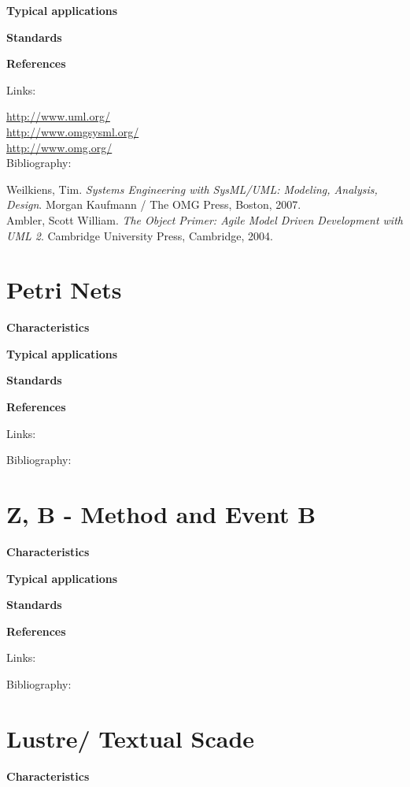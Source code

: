 \documentclass{./template/openetcs2}
\begin{document}
	\textbf{Typical applications}


	\textbf{Standards}


	\textbf{References}

Links:

\url{http://www.uml.org/} \\[4pt]
\url{http://www.omgsysml.org/}\\[4pt]
\url{http://www.omg.org/} \\[4pt]

Bibliography:

Weilkiens, Tim. \textit{Systems Engineering with SysML/UML: Modeling, Analysis, Design}. Morgan Kaufmann / The OMG Press, Boston,  2007.\\[4pt]
Ambler, Scott William. \textit{The Object Primer: Agile Model Driven Development with UML 2}. Cambridge University Press, Cambridge, 2004.\\[4pt]

\section{Petri Nets}


	\textbf{Characteristics}


	\textbf{Typical applications}


	\textbf{Standards}


	\textbf{References}

Links:



Bibliography:




\section{Z, B - Method and Event B}


	\textbf{Characteristics}


	\textbf{Typical applications}


	\textbf{Standards}


	\textbf{References}

Links:



Bibliography:

\section{Lustre/ Textual Scade}


	\textbf{Characteristics}
\end{document}
